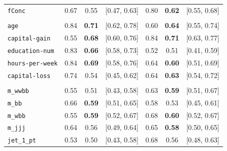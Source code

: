 \begin{table}[htbp]
\begin{tabular}{@{}l ccc ccc@{}}
\texttt{fConc} & 0.67 & 0.55 & {\scriptsize[0.47, 0.63]} & 0.80 & \textbf{0.62} & {\scriptsize[0.55, 0.68]} \\
\addlinespace[3pt]
\multicolumn{7}{@{}l}{\textit{Adult}} \\
\texttt{age} & 0.84 & \textbf{0.71} & {\scriptsize[0.62, 0.78]} & 0.60 & \textbf{0.64} & {\scriptsize[0.55, 0.74]} \\
\texttt{capital-gain} & 0.55 & \textbf{0.68} & {\scriptsize[0.60, 0.76]} & 0.84 & \textbf{0.71} & {\scriptsize[0.63, 0.77]} \\
\texttt{education-num} & 0.83 & \textbf{0.66} & {\scriptsize[0.58, 0.73]} & 0.52 & 0.51 & {\scriptsize[0.41, 0.59]} \\
\texttt{hours-per-week} & 0.84 & \textbf{0.69} & {\scriptsize[0.58, 0.76]} & 0.64 & \textbf{0.60} & {\scriptsize[0.51, 0.69]} \\
\texttt{capital-loss} & 0.74 & 0.54 & {\scriptsize[0.45, 0.62]} & 0.64 & \textbf{0.63} & {\scriptsize[0.54, 0.72]} \\
\addlinespace[3pt]
\multicolumn{7}{@{}l}{\textit{HIGGS}} \\
\texttt{m\_wwbb} & 0.55 & 0.51 & {\scriptsize[0.43, 0.58]} & 0.63 & \textbf{0.59} & {\scriptsize[0.51, 0.67]} \\
\texttt{m\_bb} & 0.66 & \textbf{0.59} & {\scriptsize[0.51, 0.65]} & 0.58 & 0.53 & {\scriptsize[0.45, 0.61]} \\
\texttt{m\_wbb} & 0.55 & \textbf{0.59} & {\scriptsize[0.52, 0.67]} & 0.68 & \textbf{0.60} & {\scriptsize[0.52, 0.67]} \\
\texttt{m\_jjj} & 0.64 & 0.56 & {\scriptsize[0.49, 0.64]} & 0.65 & \textbf{0.58} & {\scriptsize[0.50, 0.65]} \\
\texttt{jet\_1\_pt} & 0.53 & 0.50 & {\scriptsize[0.43, 0.58]} & 0.68 & 0.56 & {\scriptsize[0.48, 0.63]} \\
\bottomrule
\end{tabular}
\end{table}


